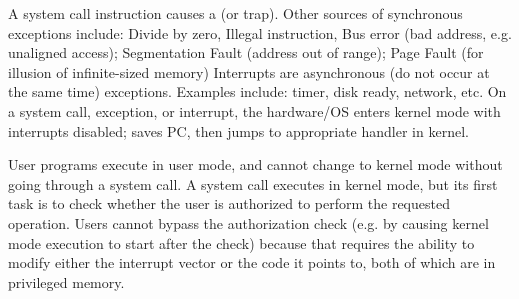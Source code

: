 A system call instruction causes a  (or trap).
Other sources of synchronous exceptions include: Divide by zero, Illegal
instruction, Bus error (bad address, e.g. unaligned access); Segmentation
Fault (address out of range); Page Fault (for illusion of infinite-sized
memory)
Interrupts are asynchronous (do not occur at the same time) exceptions. Examples include: timer, disk
ready, network, etc.
On a system call, exception, or interrupt, the hardware/OS enters kernel
mode with interrupts disabled; saves PC, then jumps to appropriate
handler in kernel.

User programs execute in user mode, and cannot change to kernel mode
without going through a system call.
A system call executes in kernel mode, but its first task is to check
whether the user is authorized to perform the requested operation. 
Users cannot bypass the authorization check (e.g. by causing kernel mode
execution to start after the check) because that requires the ability to
modify either the interrupt vector or the code it points to, both of which
are in privileged memory.

